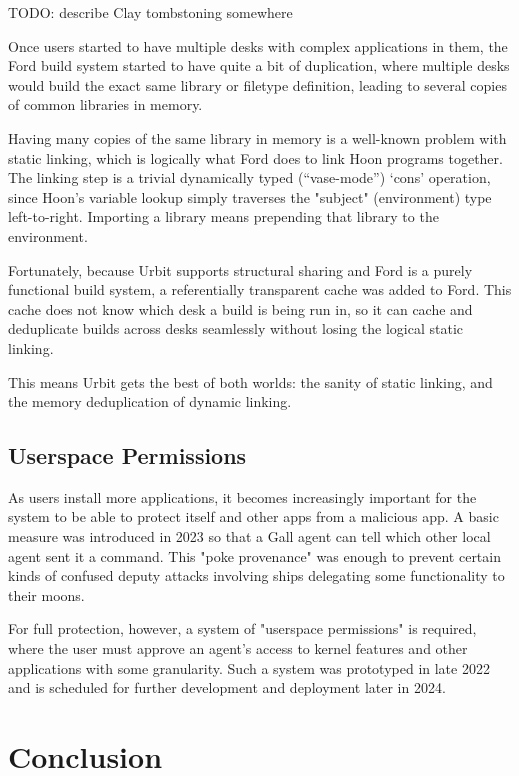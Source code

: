 \documentclass[twoside]{article}
\begin{document}
TODO: describe Clay tombstoning somewhere

Once users started to have multiple desks with complex applications in them, the Ford build system started to have quite a bit of duplication, where multiple desks would build the exact same library or filetype definition, leading to several copies of common libraries in memory.

Having many copies of the same library in memory is a well-known problem with static linking, which is logically what Ford does to link Hoon programs together.  The linking step is a trivial dynamically typed (``vase-mode'') `cons' operation, since Hoon's variable lookup simply traverses the "subject" (environment) type left-to-right.  Importing a library means prepending that library to the environment.

Fortunately, because Urbit supports structural sharing and Ford is a purely functional build system, a referentially transparent cache was added to Ford.  This cache does not know which desk a build is being run in, so it can cache and deduplicate builds across desks seamlessly without losing the logical static linking.

This means Urbit gets the best of both worlds: the sanity of static linking, and the memory deduplication of dynamic linking.

\subsection{Userspace Permissions}

As users install more applications, it becomes increasingly important for the system to be able to protect itself and other apps from a malicious app.  A basic measure was introduced in 2023 so that a Gall agent can tell which other local agent sent it a command.  This "poke provenance" was enough to prevent certain kinds of confused deputy attacks involving ships delegating some functionality to their moons.

For full protection, however, a system of "userspace permissions" is required, where the user must approve an agent's access to kernel features and other applications with some granularity.  Such a system was prototyped in late 2022 and is scheduled for further development and deployment later in 2024.

\section{Conclusion}
\end{document}

